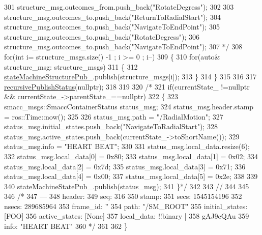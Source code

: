 \begin{DoxyCode}
301 \textcolor{comment}{    structure\_msg.outcomes\_from.push\_back("RotateDegress");}
302 \textcolor{comment}{}
303 \textcolor{comment}{    structure\_msg.outcomes\_to.push\_back("ReturnToRadialStart");}
304 \textcolor{comment}{    structure\_msg.outcomes\_to.push\_back("NavigateToEndPoint");}
305 \textcolor{comment}{    structure\_msg.outcomes\_to.push\_back("RotateDegress");}
306 \textcolor{comment}{    structure\_msg.outcomes\_to.push\_back("NavigateToEndPoint");}
307 \textcolor{comment}{*/}
308     \textcolor{keywordflow}{for}(\textcolor{keywordtype}{int} i= structure\_msgs.size() -1 ; i >= 0 ; i--)
309     \{
310         \textcolor{keywordflow}{for}(\textcolor{keyword}{auto}& structure\_msg: structure\_msgs)
311         \{
312             \hyperlink{structsmacc_1_1SmaccStateMachineBase_af586b32d0f79caba26c2dbca76a55767}{stateMachineStructurePub\_}.publish(structure\_msgs[i]);
313         \}
314     \}
315 
316     
317     \hyperlink{structsmacc_1_1SmaccStateMachineBase_a5c078ef0eec2c64ecd9a31b46341b13c}{recursivePublishStatus}(\textcolor{keyword}{nullptr});
318     
319 
320     \textcolor{comment}{/*    }
321 \textcolor{comment}{    if(currentState\_ !=nullptr && currentState\_->parentState\_==nullptr)}
322 \textcolor{comment}{    \{        }
323 \textcolor{comment}{        smacc\_msgs::SmaccContainerStatus status\_msg;}
324 \textcolor{comment}{        status\_msg.header.stamp = ros::Time::now();}
325 \textcolor{comment}{}
326 \textcolor{comment}{        status\_msg.path = "/RadialMotion";}
327 \textcolor{comment}{        status\_msg.initial\_states.push\_back("NavigateToRadialStart");}
328 \textcolor{comment}{        status\_msg.active\_states.push\_back(currentState\_->toShortName());}
329 \textcolor{comment}{        status\_msg.info = "HEART BEAT";}
330 \textcolor{comment}{        }
331 \textcolor{comment}{        status\_msg.local\_data.resize(6);}
332 \textcolor{comment}{        status\_msg.local\_data[0] = 0x80;}
333 \textcolor{comment}{        status\_msg.local\_data[1] = 0x02;}
334 \textcolor{comment}{        status\_msg.local\_data[2] = 0x7d;}
335 \textcolor{comment}{        status\_msg.local\_data[3] =  0x71;}
336 \textcolor{comment}{        status\_msg.local\_data[4] = 0x00;}
337 \textcolor{comment}{        status\_msg.local\_data[5] = 0x2e;}
338 \textcolor{comment}{}
339 \textcolor{comment}{}
340 \textcolor{comment}{        stateMachineStatePub\_.publish(status\_msg);}
341 \textcolor{comment}{    \}*/}
342 
343 \textcolor{comment}{//}
344 
345 
346     \textcolor{comment}{/*}
347 \textcolor{comment}{    ---}
348 \textcolor{comment}{    header: }
349 \textcolor{comment}{    seq: 316}
350 \textcolor{comment}{    stamp: }
351 \textcolor{comment}{        secs: 1545154196}
352 \textcolor{comment}{        nsecs: 289685964}
353 \textcolor{comment}{    frame\_id: ''}
354 \textcolor{comment}{    path: "/SM\_ROOT"}
355 \textcolor{comment}{    initial\_states: [FOO]}
356 \textcolor{comment}{    active\_states: [None]}
357 \textcolor{comment}{    local\_data: !!binary |}
358 \textcolor{comment}{    gAJ9cQAu}
359 \textcolor{comment}{    info: "HEART BEAT"}
360 \textcolor{comment}{    */}
361     
362 \}      
\end{DoxyCode}
